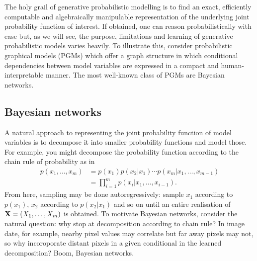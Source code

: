 \documentclass[11pt]{article}
\begin{document}
The holy grail of generative probabilistic modelling is to find an exact, efficiently computable and algebraically manipulable representation of the underlying joint probability function of interest. If obtained, one can reason probabilistically with ease but, as we will see, the purpose, limitations and learning of generative probabilistic models varies heavily. To illustrate this, consider probabilistic graphical models (PGMs) which offer a graph structure in which conditional dependencies between model variables are expressed in a compact and human-interpretable manner. The most well-known class of PGMs are Bayesian networks.

\subsection{\IMPROVE Bayesian networks}
A natural approach to representing the joint probability function of model variables is to decompose it into smaller probability functions and model those. For example, you might decompose the probability function according to the chain rule of probability as in
\begin{align*}
    p(x_1,\dots,x_m)
    &=
    p(x_1)p(x_2|x_1)\cdots p(x_m|x_1,\dots,x_{m-1})\\
    &=
    \prod_{i=1}^m p(x_i|x_1,\dots,x_{i-1}).
\end{align*}
From here, sampling may be done autoregressively: sample $x_1$ according to $p(x_1)$, $x_2$ according to $p(x_2|x_1)$ and so on until an entire realisation of $\mathbf{X}=(X_1,\dots,X_m)$ is obtained. To motivate Bayesian networks, consider the natural question: why stop at decomposition according to chain rule? In image date, for example, nearby pixel values may correlate but far away pixels may not, so why incoroporate distant pixels in a given conditional in the learned decomposition? Boom, Bayesian networks.
\end{document}

